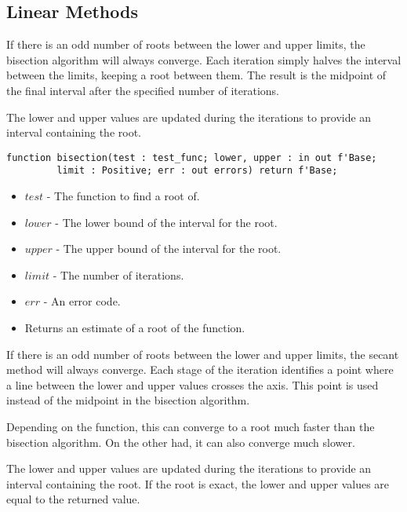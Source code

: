 \documentclass[10pt, openany]{book}
\begin{document}
\subsection{Linear Methods}
If there is an odd number of roots between the lower and upper limits, the bisection algorithm will always converge.  Each iteration simply halves the interval between the limits, keeping a root between them.  The result is the midpoint of the final interval after the specified number of iterations.

The lower and upper values are updated during the iterations to provide an interval containing the root.
\begin{lstlisting}
function bisection(test : test_func; lower, upper : in out f'Base;
         limit : Positive; err : out errors) return f'Base;
\end{lstlisting}
\begin{itemize}
  \item $test$ - The function to find a root of.
  \item $lower$ - The lower bound of the interval for the root.
  \item $upper$ - The upper bound of the interval for the root.
  \item $limit$ - The number of iterations.
  \item $err$ - An error code.
  \item Returns an estimate of a root of the function.
\end{itemize}

If there is an odd number of roots between the lower and upper limits, the secant method will always converge.  Each stage of the iteration identifies a point where a line between the lower and upper values crosses the axis.  This point is used instead of the midpoint in the bisection algorithm.

Depending on the function, this can converge to a root much faster than the bisection algorithm.  On the other had, it can also converge much slower.

The lower and upper values are updated during the iterations to provide an interval containing the root.  If the root is exact, the lower and upper values are equal to the returned value.
\end{document}
